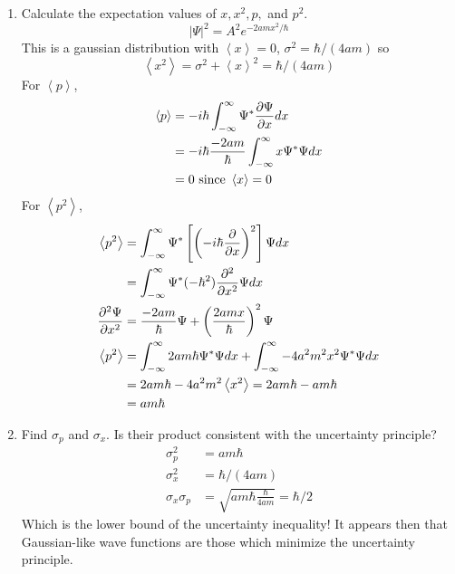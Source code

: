 \documentclass{article}
\newcommand{\ddx}[1]{\frac{\partial #1}{\partial x}}
\newcommand{\dddx}[1]{\frac{\partial^2 #1}{\partial x^2}}
\newcommand{\bracket}[1]{\left[ #1 \right]}
\newcommand{\paren}[1]{\left( #1 \right)}
\newcommand{\braket}[1]{\left\langle #1 \right\rangle}
\begin{document}
\begin{enumerate}[label=(\alph*)]
  \item Calculate the expectation values of \(x, x^2, p,\) and \(p^2\).
    \[|\Psi|^2 = A^2e^{-2amx^2/\hbar}\]
    This is a gaussian distribution with $\braket{x} = 0$, $\sigma^2 = \hbar / (4am)$ so 
    \[\braket{x^2} = \sigma^2 + \braket{x}^2 = \hbar / (4am)\]
    For \(\braket{p}\), 
    \begin{align*}
      \braket{p} &= -i \hbar \intinf \Psi^*\ddx{\Psi} dx \\
                 &= -i \hbar \frac{-2am}{\hbar} \intinf x \Psi^* \Psi dx \\
                 &= 0 \text{ since } \braket{x} = 0
    \end{align*}
    For \(\braket{p^2}\),
    \begin{align*}
      \braket{p^2} &= \intinf \Psi^* \bracket{\paren{-i\hbar\ddx{}}^2} \Psi dx \\
                   &= \intinf \Psi^* (-\hbar^2) \dddx{} \Psi dx \\
       \dddx{\Psi} &= \frac{-2am}{\hbar}\Psi + \paren{\frac{2amx}{\hbar}}^2 \Psi \\
       \braket{p^2} &= \intinf 2am\hbar \Psi^* \Psi dx + \intinf -4a^2m^2x^2 \Psi^* \Psi dx \\
                    &= 2am\hbar - 4a^2m^2 \braket{x^2} = 2am\hbar - am\hbar \\
                    &= am\hbar
    \end{align*}
  \item Find $\sigma_p$ and $\sigma_x$. Is their product consistent with the uncertainty principle?
    \begin{align*}
      \sigma_p^2 &= am\hbar \\
      \sigma_x^2 &= \hbar/(4am) \\
      \sigma_x \sigma_p &= \sqrt{am\hbar \frac{\hbar}{4am}} = \hbar / 2
    \end{align*}
    Which is the lower bound of the uncertainty inequality! It appears then that Gaussian-like wave functions are those which minimize the uncertainty principle.
\end{enumerate}
\end{document}
